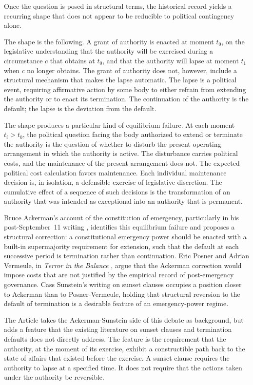 Once the question is posed in structural terms,
the historical record yields a recurring shape that does not appear to be reducible to political contingency alone.

The shape is the following.
A grant of authority is enacted at moment $t_0$,
on the legislative understanding that the authority will be exercised during a circumstance $c$ that obtains at $t_0$,
and that the authority will lapse at moment $t_1$ when $c$ no longer obtains.
The grant of authority does not, however, include a structural mechanism that makes the lapse automatic.
The lapse is a political event, requiring affirmative action by some body
to either refrain from extending the authority or to enact its termination.
The continuation of the authority is the default;
the lapse is the deviation from the default.

The shape produces a particular kind of equilibrium failure.
At each moment $t_i > t_0$, the political question facing the body authorized to extend or terminate
the authority is the question of whether to disturb the present operating arrangement
in which the authority is active.
The disturbance carries political costs, and the maintenance of the present arrangement does not.
The expected political cost calculation favors maintenance.
Each individual maintenance decision is, in isolation, a defensible exercise of legislative discretion.
The cumulative effect of a sequence of such decisions is the transformation of an authority that was
intended as exceptional into an authority that is permanent.

Bruce Ackerman's account of the constitution of emergency, particularly in his post-September~11 writing
\cite{ref_ackerman_before_next_attack},
identifies this equilibrium failure and proposes a structural correction:
a constitutional emergency power should be enacted with a built-in supermajority requirement for extension,
such that the default at each successive period is termination rather than continuation.
Eric Posner and Adrian Vermeule, in \emph{Terror in the Balance} \cite{ref_posner_vermeule_terror},
argue that the Ackerman correction would impose costs that are not justified by the empirical record
of post-emergency governance.
Cass Sunstein's writing on sunset clauses \cite{ref_sunstein_sunset_clauses} occupies a position closer
to Ackerman than to Posner-Vermeule, holding that structural reversion to the default of termination
is a desirable feature of an emergency-power regime.

The Article takes the Ackerman-Sunstein side of this debate as background,
but adds a feature that the existing literature on sunset clauses and termination defaults does not directly address.
The feature is the requirement that the authority, at the moment of its exercise,
exhibit a constructible path back to the state of affairs that existed before the exercise.
A sunset clause requires the authority to lapse at a specified time.
It does not require that the actions taken under the authority be reversible.

